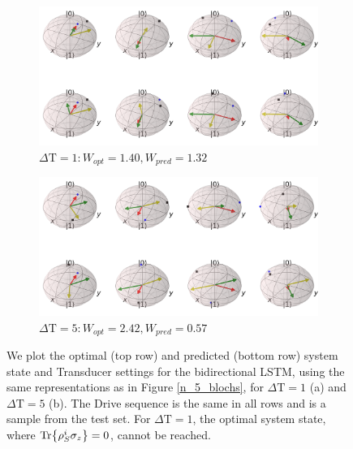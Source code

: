 \begin{figure}
	\centering
	\begin{subfigure}{0.85\textwidth}
		\centering
		\includegraphics[width=\textwidth]{img/bloch_comp_1_crop}
		\caption{$\Delta \mathrm{T} = 1: W_{opt} = 1.40, W_{pred} = 1.32$}
		\label{}
	\end{subfigure}
	\begin{subfigure}{0.85\textwidth}
		\centering
		\includegraphics[width=\textwidth]{img/bloch_comp_5_crop}
		\caption{$\Delta \mathrm{T} = 5: W_{opt} = 2.42, W_{pred} = 0.57$}
		\label{}
	\end{subfigure}
	\caption{We plot the optimal (top row) and predicted (bottom row) system state and Transducer settings for the bidirectional LSTM, using the same representations as in Figure \ref{n_5_blochs}, for $\Delta \mathrm{T} = 1$ (a) and $\Delta \mathrm{T} = 5$ (b). The Drive sequence is the same in all rows and is a sample from the test set. For $\Delta \mathrm{T} = 1$, the optimal system state, where $\Tr{\rho_S^i \sigma_z} = 0$, cannot be reached.}
	\label{}
\end{figure}